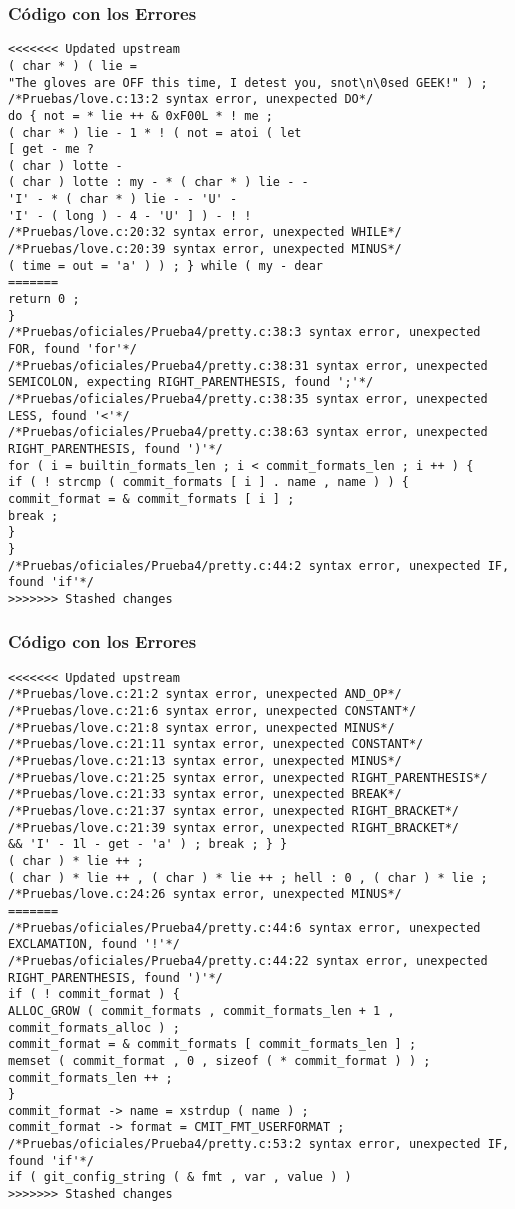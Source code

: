 \documentclass{beamer}
\begin{document}
\begin{frame}[fragile]
\frametitle{C\'odigo con los Errores}
\begin{verbatim}
<<<<<<< Updated upstream
( char * ) ( lie = 
"The gloves are OFF this time, I detest you, snot\n\0sed GEEK!" ) ; 
/*Pruebas/love.c:13:2 syntax error, unexpected DO*/
do { not = * lie ++ & 0xF00L * ! me ; 
( char * ) lie - 1 * ! ( not = atoi ( let 
[ get - me ? 
( char ) lotte - 
( char ) lotte : my - * ( char * ) lie - - 
'I' - * ( char * ) lie - - 'U' - 
'I' - ( long ) - 4 - 'U' ] ) - ! ! 
/*Pruebas/love.c:20:32 syntax error, unexpected WHILE*/
/*Pruebas/love.c:20:39 syntax error, unexpected MINUS*/
( time = out = 'a' ) ) ; } while ( my - dear 
=======
return 0 ; 
} 
/*Pruebas/oficiales/Prueba4/pretty.c:38:3 syntax error, unexpected FOR, found 'for'*/
/*Pruebas/oficiales/Prueba4/pretty.c:38:31 syntax error, unexpected SEMICOLON, expecting RIGHT_PARENTHESIS, found ';'*/
/*Pruebas/oficiales/Prueba4/pretty.c:38:35 syntax error, unexpected LESS, found '<'*/
/*Pruebas/oficiales/Prueba4/pretty.c:38:63 syntax error, unexpected RIGHT_PARENTHESIS, found ')'*/
for ( i = builtin_formats_len ; i < commit_formats_len ; i ++ ) { 
if ( ! strcmp ( commit_formats [ i ] . name , name ) ) { 
commit_format = & commit_formats [ i ] ; 
break ; 
} 
} 
/*Pruebas/oficiales/Prueba4/pretty.c:44:2 syntax error, unexpected IF, found 'if'*/
>>>>>>> Stashed changes
\end{verbatim}
\end{frame}
\begin{frame}[fragile]
\frametitle{C\'odigo con los Errores}
\begin{verbatim}
<<<<<<< Updated upstream
/*Pruebas/love.c:21:2 syntax error, unexpected AND_OP*/
/*Pruebas/love.c:21:6 syntax error, unexpected CONSTANT*/
/*Pruebas/love.c:21:8 syntax error, unexpected MINUS*/
/*Pruebas/love.c:21:11 syntax error, unexpected CONSTANT*/
/*Pruebas/love.c:21:13 syntax error, unexpected MINUS*/
/*Pruebas/love.c:21:25 syntax error, unexpected RIGHT_PARENTHESIS*/
/*Pruebas/love.c:21:33 syntax error, unexpected BREAK*/
/*Pruebas/love.c:21:37 syntax error, unexpected RIGHT_BRACKET*/
/*Pruebas/love.c:21:39 syntax error, unexpected RIGHT_BRACKET*/
&& 'I' - 1l - get - 'a' ) ; break ; } } 
( char ) * lie ++ ; 
( char ) * lie ++ , ( char ) * lie ++ ; hell : 0 , ( char ) * lie ; 
/*Pruebas/love.c:24:26 syntax error, unexpected MINUS*/
=======
/*Pruebas/oficiales/Prueba4/pretty.c:44:6 syntax error, unexpected EXCLAMATION, found '!'*/
/*Pruebas/oficiales/Prueba4/pretty.c:44:22 syntax error, unexpected RIGHT_PARENTHESIS, found ')'*/
if ( ! commit_format ) { 
ALLOC_GROW ( commit_formats , commit_formats_len + 1 , 
commit_formats_alloc ) ; 
commit_format = & commit_formats [ commit_formats_len ] ; 
memset ( commit_format , 0 , sizeof ( * commit_format ) ) ; 
commit_formats_len ++ ; 
} 
commit_format -> name = xstrdup ( name ) ; 
commit_format -> format = CMIT_FMT_USERFORMAT ; 
/*Pruebas/oficiales/Prueba4/pretty.c:53:2 syntax error, unexpected IF, found 'if'*/
if ( git_config_string ( & fmt , var , value ) ) 
>>>>>>> Stashed changes
\end{verbatim}
\end{frame}
\end{document}
